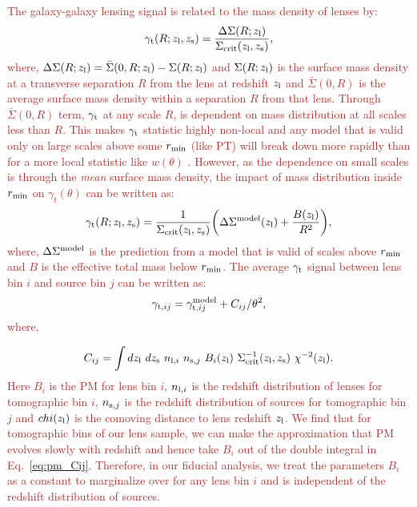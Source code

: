 \documentclass[fleqn,usenatbib]{mnras}
\newcommand{\gammat}{\ensuremath{\gamma_{t}(\theta)} }
\newcommand{\wtheta}{\ensuremath{w(\theta)} }
\newcommand{\brown}[1]{\textcolor{brown}{#1}}
\begin{document}
        
    \brown{The galaxy-galaxy lensing signal is related to the mass density of lenses by:
    \begin{equation}
        \gamma_{\rm t}(R;z_{\rm l},z_{\rm s}) = \frac{\Delta \Sigma (R;z_{\rm l})}{\Sigma_{\rm crit} (z_{\rm l},z_{\rm s})},
    \end{equation}
    where, $\Delta \Sigma(R;z_{\rm l}) = \bar{\Sigma}(0,R; z_{\rm l}) - \Sigma(R;z_{\rm l})$ and $\Sigma(R;z_{\rm l})$ is the surface mass density at a transverse separation $R$ from the lens at redshift $z_{\rm l}$ and $\bar{\Sigma}(0,R)$ is the average surface mass density within a separation $R$ from that lens. Through $\bar{\Sigma}(0,R)$ term, $\gamma_{\rm t}$  at any scale $R$, is dependent on mass distribution at all scales less than $R$. This makes $\gamma_{\rm t}$ statistic highly non-local and any model that is valid only on large scales above some $r_{\rm min}$ (like PT) will break down more rapidly than for a more local statistic like \wtheta. However, as the dependence on small scales is through the \textit{mean} surface mass density, the impact of mass distribution inside $r_{\rm min}$ on \gammat can be written as:
    \begin{equation}
        \gamma_{\rm t}(R;z_{\rm l},z_{\rm s}) = \frac{1}{\Sigma_{\rm crit}(z_{\rm l},z_{\rm s})} \bigg(\Delta \Sigma^{\rm model}(z_{\rm l}) + \frac{B(z_{\rm l})}{R^2} \bigg),
    \end{equation}
    where, $\Delta \Sigma^{\rm model}$ is the prediction from a model that is valid of scales above $r_{\rm min}$ and $B$ is the effective total mass below $r_{\rm min}$.  The average $\gamma_{\rm t}$ signal between lens bin $i$ and source bin $j$ can be written as:
    \begin{equation}
        \gamma_{{\rm t},ij} = \gamma^{\rm model}_{{\rm t},ij} + C_{ij}/\theta^2,
    \end{equation}
    where,
    
    \begin{equation}\label{eq:pm_Cij}
        C_{ij} = \int dz_{\rm l} \ dz_{\rm s} \ n_{{\rm l},i} \ n_{{\rm s},j} \ B_i(z_{\rm l}) \ \Sigma^{-1}_{\rm crit}(z_{\rm l},z_{\rm s}) \ \chi^{-2}(z_{\rm l}).
    \end{equation}
    Here $B_i$ is the PM for lens bin $i$, $n_{{\rm l},i}$ is the redshift distribution of lenses for tomographic bin $i$, $n_{{\rm s},j}$ is the redshift distribution of sources for tomographic bin $j$ and $chi(z_{\rm l})$ is the comoving distance to lens redshift $z_{\rm l}$. We find that for tomographic bins of our lens sample, we can make the approximation that PM evolves slowly with redshift and hence take $B_i$ out of the double integral in Eq.~\ref{eq:pm_Cij}. Therefore, in our fiducial analysis, we treat the parameters $B_i$ as a constant to marginalize over for any lens bin $i$ and is independent of the redshift distribution of sources. 
    }
    
\end{document}
